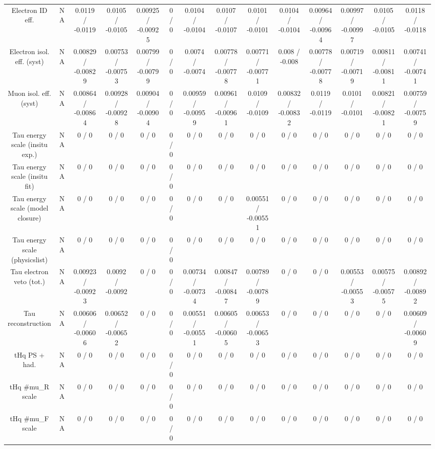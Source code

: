 \documentclass[10pt]{article}
\begin{document}
\begin{table}[htbp]
\begin{center}
\begin{tabular}{|c|c|c|c|c|c|c|c|c|c|c|c|c|c|}
  Electron ID eff. &    NA    & 0.0119 / -0.0119 & 0.0105 / -0.0105 & 0.00925 / -0.00925 & 0 / 0 & 0.0104 / -0.0104 & 0.0107 / -0.0107 & 0.0101 / -0.0101 & 0.0104 / -0.0104 & 0.00964 / -0.00964 & 0.00997 / -0.00997 & 0.0105 / -0.0105 & 0.0118 / -0.0118 \\ 
  Electron isol. eff. (syst) &    NA    & 0.00829 / -0.00829 & 0.00753 / -0.00753 & 0.00799 / -0.00799 & 0 / 0 & 0.0074 / -0.0074 & 0.00778 / -0.00778 & 0.00771 / -0.00771 & 0.008 / -0.008 & 0.00778 / -0.00778 & 0.00719 / -0.00719 & 0.00811 / -0.00811 & 0.00741 / -0.00741 \\ 
  Muon isol. eff. (syst) &    NA    & 0.00864 / -0.00864 & 0.00928 / -0.00928 & 0.00904 / -0.00904 & 0 / 0 & 0.00959 / -0.00959 & 0.00961 / -0.00961 & 0.0109 / -0.0109 & 0.00832 / -0.00832 & 0.0119 / -0.0119 & 0.0101 / -0.0101 & 0.00821 / -0.00821 & 0.00759 / -0.00759 \\ 
  Tau energy scale (insitu exp.) &    NA    & 0 / 0 & 0 / 0 & 0 / 0 & 0 / 0 & 0 / 0 & 0 / 0 & 0 / 0 & 0 / 0 & 0 / 0 & 0 / 0 & 0 / 0 & 0 / 0 \\ 
  Tau energy scale (insitu fit) &    NA    & 0 / 0 & 0 / 0 & 0 / 0 & 0 / 0 & 0 / 0 & 0 / 0 & 0 / 0 & 0 / 0 & 0 / 0 & 0 / 0 & 0 / 0 & 0 / 0 \\ 
  Tau energy scale (model closure) &    NA    & 0 / 0 & 0 / 0 & 0 / 0 & 0 / 0 & 0 / 0 & 0 / 0 & 0.00551 / -0.00551 & 0 / 0 & 0 / 0 & 0 / 0 & 0 / 0 & 0 / 0 \\ 
  Tau energy scale (physicslist) &    NA    & 0 / 0 & 0 / 0 & 0 / 0 & 0 / 0 & 0 / 0 & 0 / 0 & 0 / 0 & 0 / 0 & 0 / 0 & 0 / 0 & 0 / 0 & 0 / 0 \\ 
  Tau electron veto (tot.) &    NA    & 0.00923 / -0.00923 & 0.0092 / -0.0092 & 0 / 0 & 0 / 0 & 0.00734 / -0.00734 & 0.00847 / -0.00847 & 0.00789 / -0.00789 & 0 / 0 & 0 / 0 & 0.00553 / -0.00553 & 0.00575 / -0.00575 & 0.00892 / -0.00892 \\ 
  Tau reconstruction &    NA    & 0.00606 / -0.00606 & 0.00652 / -0.00652 & 0 / 0 & 0 / 0 & 0.00551 / -0.00551 & 0.00605 / -0.00605 & 0.00653 / -0.00653 & 0 / 0 & 0 / 0 & 0 / 0 & 0 / 0 & 0.00609 / -0.00609 \\ 
  tHq PS + had. &    NA    & 0 / 0 & 0 / 0 & 0 / 0 & 0 / 0 & 0 / 0 & 0 / 0 & 0 / 0 & 0 / 0 & 0 / 0 & 0 / 0 & 0 / 0 & 0 / 0 \\ 
  tHq #mu_{R} scale &    NA    & 0 / 0 & 0 / 0 & 0 / 0 & 0 / 0 & 0 / 0 & 0 / 0 & 0 / 0 & 0 / 0 & 0 / 0 & 0 / 0 & 0 / 0 & 0 / 0 \\ 
  tHq #mu_{F} scale &    NA    & 0 / 0 & 0 / 0 & 0 / 0 & 0 / 0 & 0 / 0 & 0 / 0 & 0 / 0 & 0 / 0 & 0 / 0 & 0 / 0 & 0 / 0 & 0 / 0 \\ 

\end{tabular}
\end{center}
\end{table}
\end{document}
